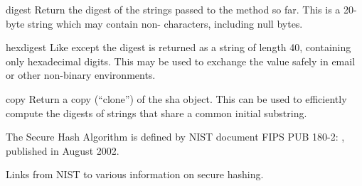 \begin{methoddesc}[sha]{digest}{}
Return the digest of the strings passed to the 
method so far.  This is a 20-byte string which may contain
non-\ASCII{} characters, including null bytes.
\end{methoddesc}

\begin{methoddesc}[sha]{hexdigest}{}
Like  except the digest is returned as a string of
length 40, containing only hexadecimal digits.  This may 
be used to exchange the value safely in email or other non-binary
environments.
\end{methoddesc}

\begin{methoddesc}[sha]{copy}{}
Return a copy (``clone'') of the sha object.  This can be used to
efficiently compute the digests of strings that share a common initial
substring.
\end{methoddesc}

\begin{seealso}
    {The Secure Hash Algorithm is defined by NIST document FIPS
     PUB 180-2:
     , published in August 2002.}

           {Links from NIST to various information on secure hashing.}
\end{seealso}

